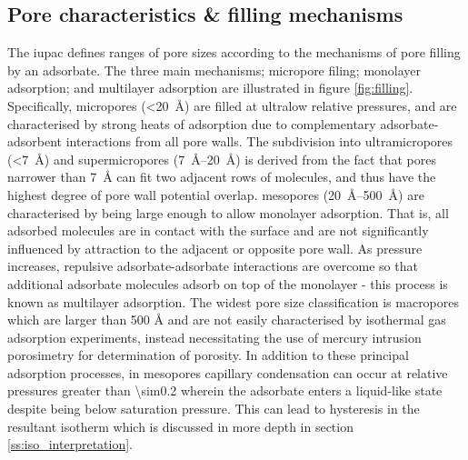 \subsection{Pore characteristics \& filling mechanisms}
\label{ss:pore_filling}

The \acrfull{iupac} defines ranges of pore sizes according to the mechanisms of pore filling by an \gls{adsorbate}.\citep{Thommes2015Physisorption} The three main mechanisms; \gls{micropore} filing; monolayer adsorption; and multilayer adsorption are illustrated in figure \ref{fig:filling}. Specifically, \glspl{micropore} (\qty{<20}{\angstrom})\citep{mcnaught1997compendium} are filled at ultralow relative pressures, and are characterised by strong heats of adsorption due to complementary \gls{adsorbate}-\gls{adsorbent} interactions from all pore walls.\citep{dubinin1989fundamentals} The subdivision into \glspl{ultramicropore} (\qty{<7}{\angstrom}) and \glspl{supermicropore} (\qtyrange[range-units=single]{7}{20}{\angstrom})\citep{mcnaught1997compendium} is derived from the fact that pores narrower than \qty{7}{\angstrom} can fit two adjacent rows of  molecules,\citep{Thommes2015Physisorption} and thus have the highest degree of pore wall potential overlap. \Glspl{mesopore} (\qtyrange[range-units=single]{20}{500}{\angstrom})\citep{mcnaught1997compendium} are characterised by being large enough to allow monolayer adsorption. That is, all adsorbed molecules are in contact with the surface and are not significantly influenced by attraction to the adjacent or opposite pore wall.\citep{gregg1967adsorption, yang1997gas} As pressure increases, repulsive \gls{adsorbate}-\gls{adsorbate} interactions are overcome so that additional \gls{adsorbate} molecules adsorb on top of the monolayer - this process is known as multilayer adsorption. The widest pore size classification is \glspl{macropore} which are larger than 500 \unit{\angstrom}\citep{mcnaught1997compendium} and are not easily characterised by isothermal gas adsorption experiments, instead necessitating the use of mercury intrusion porosimetry for determination of porosity.\citep{abell1999mercury, gregg1967adsorption, haynes1973pore} In addition to these principal adsorption processes, in \glspl{mesopore} capillary condensation can occur at relative pressures greater than \num{\sim0.2} wherein the adsorbate enters a liquid-like state despite being below saturation pressure. This can lead to hysteresis in the resultant isotherm\citep{Thommes2015Physisorption, monson2012understanding} which is discussed in more depth in section \ref{ss:iso_interpretation}.

